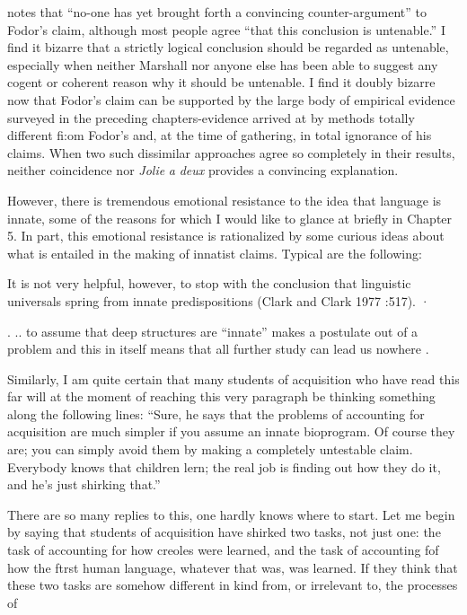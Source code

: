 \citet{Marshall1979} notes that ``no-one has yet brought forth a convincing counter-argument'' to Fodor's claim, although most people agree ``that this conclusion is untenable.'' I find it bizarre that a strictly logical conclusion should be regarded as untenable, especially when neither Marshall nor anyone else has been able to suggest any cogent or coherent reason why it should be untenable. I find it doubly bizarre now that Fodor's claim can be supported by the large body of empirical evidence surveyed in the preceding chapters-evidence arrived at by methods totally different fi:om Fodor's and, at the time of gathering, in total ignorance of his claims. When two such dissimilar approaches
agree so completely in their results, neither coincidence nor \textit{Jolie} \textit{a}
\textit{deux} provides a convincing explanation.

However, there is tremendous emotional resistance to the idea that language is innate, some of the reasons for which I would like to glance at briefly in Chapter 5. In part, this emotional resistance is rationalized by some curious ideas about what is entailed in the making of innatist claims. Typical are the following:

It is not very helpful, however, to stop with the conclu\-sion that linguistic universals spring from innate predispositions (Clark and Clark 1977 :517). ·

. .. to assume that deep structures are ``innate'' makes a postulate out of a problem and this in itself means that all further study can lead us nowhere \citep[383]{Luria1975}.

Similarly, I am quite certain that many students of acquisition who have read this far will at the moment of reaching this very para\-graph be thinking something along the following lines: ``Sure, he says that the problems of accounting for acquisition are much simpler if you assume an innate bioprogram. Of course they are; you can simply avoid them by making a completely untestable claim. Everybody knows that children lern; the real job is finding out how they do it, and he's
just shirking that.''


There are so many replies to this, one hardly knows where to start. Let me begin by saying that students of acquisition have shirked
two tasks, not just one: the task of accounting for how creoles were learned, and the task of accounting fof how the ftrst human language, whatever that was, was learned. If they think that these two tasks are somehow different in kind from, or irrelevant to, the processes of

